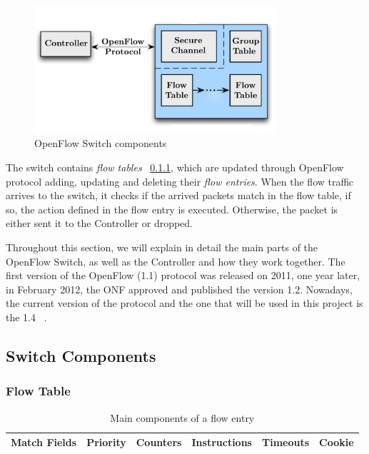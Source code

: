 \par 

\begin{figure}[htb]
\centering
\includegraphics[width=0.8\textwidth]{./images/OpenFlowSwitch.pdf}
\caption{OpenFlow Switch components} \label{fig:OpenFlowSwitch}
\end{figure}

\par 

The switch contains \textit{flow tables} ~\ref{subsec:SCFlowTable}, which are updated through OpenFlow protocol adding, updating and deleting their \textit{flow entries}. When the flow traffic arrives to the switch, it checks if the arrived packets match in the flow table, if so, the action defined in the flow entry is executed. Otherwise, the packet is either sent it to the Controller or dropped.

\bigskip

Throughout this section, we will explain in detail the main parts of the OpenFlow Switch, as well as the Controller and how they work together. The first version of the OpenFlow (1.1) protocol was released on 2011, one year later, in February 2012, the ONF approved and published the version 1.2. Nowadays, the current version of the protocol and the one that will be used in this project is the 1.4 ~\cite{OpenFlowSpecification}.

\subsection{Switch Components}
\label{subsec:PFSwitchComponents}

\subsubsection{Flow Table}
\label{subsec:SCFlowTable}

\begin{table}[h]
\centering
\begin{tabular}{ | c | c | c | c | c | c | }
  \hline                       
  Match Fields & Priority & Counters & Instructions & Timeouts & Cookie \\
  \hline  
\end{tabular}
\caption{Main components of a flow entry}
\end{table}


